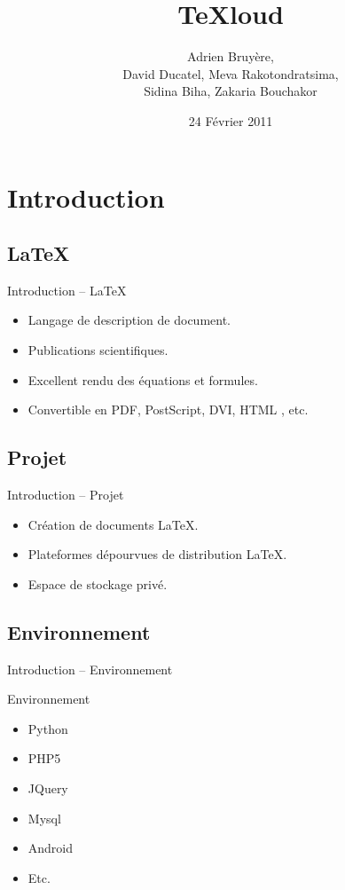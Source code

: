\documentclass{beamer}
\title{TeXloud}
\author{Adrien Bruyère,\\David Ducatel, Meva Rakotondratsima,\\Sidina Biha, Zakaria Bouchakor}
\institute{Université du Havre}
\date{24 Février 2011}
\begin{document}
\begin{frame} %
  \titlepage
\end{frame}



\section{Introduction}
\subsection{\LaTeX}
\begin{frame}{Introduction -- \LaTeX}
	\begin{itemize}
	\item Langage de description de document.
	\item Publications scientifiques.
	\item Excellent rendu des équations et formules.
	\item Convertible en PDF, PostScript, DVI, HTML , etc.
	\end{itemize}
\end{frame}


\subsection{Projet}
\begin{frame}{Introduction -- Projet}
	\begin{itemize}
	 \item Création de documents \LaTeX.
     \item Plateformes dépourvues de distribution \LaTeX.
     \item Espace de stockage privé.
	\end{itemize}
\end{frame}

\subsection{Environnement}
\begin{frame}{Introduction -- Environnement}
	\begin{block}{Environnement}
		\begin{itemize}
		\item Python
		\item PHP5
		\item JQuery
		\item Mysql
		\item Android
		\item Etc.
		\end{itemize}
	\end{block}
\end{frame}
\end{document}
